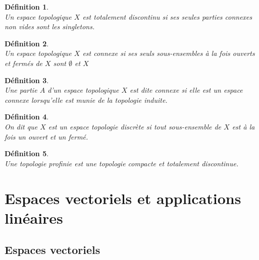 \documentclass[a4paper, 14pt]{report}
\newtheorem{definition}{Définition}[section]
\begin{document}
\begin{onehalfspace}
{\begin{definition} \cite{kuratowski2014topology}\\
Un espace topologique \( X \) est totalement discontinu si ses seules parties connexes non vides sont les singletons.
\end{definition}


\begin{definition} \cite{bourbaki2013general}\\
Un espace topologique \( X \) est connexe si ses seuls sous-ensembles à la fois ouverts et fermés de \( X \) sont \( \emptyset \) et \( X \)
\end{definition}


\begin{definition} \cite{kuratowski2014topology}\\
Une partie \( A \) d'un espace topologique \( X \) est dite connexe si elle est un espace connexe lorsqu'elle est munie de la topologie induite.
\end{definition}

\begin{definition} \cite{kuratowski2014topology}\\
On dit que \( X \) est un espace topologie discrète si tout sous-ensemble de \( X \) est à la fois un ouvert et un fermé.
\end{definition}

\begin{definition} \cite{bourbaki2013general}\\
Une topologie profinie est une topologie compacte et totalement discontinue.
\end{definition}





\section{Espaces vectoriels et applications linéaires}
\subsection{Espaces vectoriels}

}
\end{onehalfspace}
\end{document}
